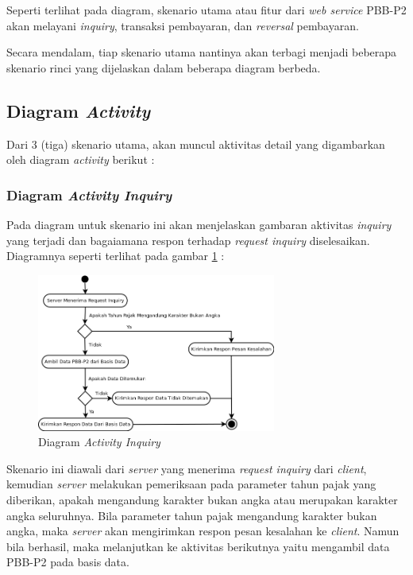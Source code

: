 \documentclass[pdftex,12pt, oneside]{article}
\begin{document}
Seperti terlihat pada diagram, skenario utama atau fitur dari \textit{web service} PBB-P2 akan melayani \textit{inquiry}, transaksi pembayaran, dan \textit{reversal} pembayaran.

Secara mendalam, tiap skenario utama nantinya akan terbagi menjadi beberapa skenario rinci yang dijelaskan dalam beberapa diagram berbeda.

\subsection{Diagram \textit{Activity}}

Dari 3 (tiga) skenario utama, akan muncul aktivitas detail yang digambarkan oleh diagram \textit{activity} berikut :

\subsubsection{Diagram \textit{Activity Inquiry}}

Pada diagram untuk skenario ini akan menjelaskan gambaran aktivitas \textit{inquiry} yang terjadi dan bagaiamana respon terhadap \textit{request inquiry} diselesaikan. Diagramnya seperti terlihat pada gambar \ref{fig:uml-act-inq} :

\begin{figure}[H]
  \centering
  \includegraphics[width=0.7\textwidth]{./resources/diagram/uml-act-inquiry}
  \caption{Diagram \textit{Activity Inquiry}}
  \label{fig:uml-act-inq}
\end{figure}

Skenario ini diawali dari \textit{server} yang menerima \textit{request inquiry} dari \textit{client}, kemudian \textit{server} melakukan pemeriksaan pada parameter tahun pajak yang diberikan, apakah mengandung karakter bukan angka atau merupakan karakter angka seluruhnya. Bila parameter tahun pajak mengandung karakter bukan angka, maka \textit{server} akan mengirimkan respon pesan kesalahan ke \textit{client}. Namun bila berhasil, maka melanjutkan ke aktivitas berikutnya yaitu mengambil data PBB-P2 pada basis data.
\end{document}
